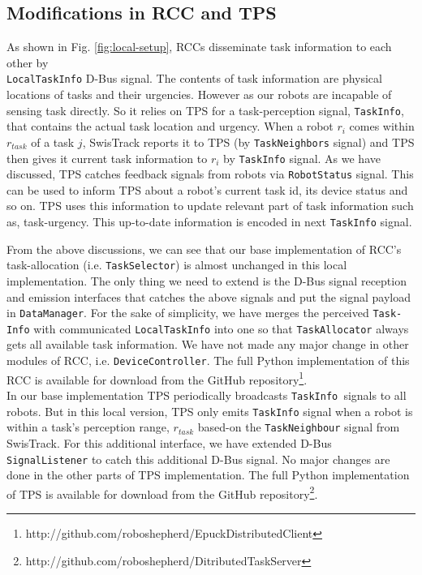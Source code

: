 \subsection*{Modifications in RCC and TPS}
As shown in Fig. \ref{fig:local-setup}, RCCs disseminate task information to each other by\\ \texttt{LocalTaskInfo} D-Bus signal. The contents of task information are physical locations of tasks and their urgencies. However as our robots are incapable of sensing task directly. So it relies on TPS for a task-perception signal, \texttt{TaskInfo}, that contains the actual task location and urgency. When a robot $r_i$ comes within $r_{task}$ of a task $j$, SwisTrack reports it to TPS (by \texttt{TaskNeighbors} signal) and TPS then gives it current task information to $r_i$ by  \texttt{TaskInfo} signal. As we have discussed, TPS catches feedback signals from robots via \texttt{RobotStatus} signal. This can be used to inform TPS about a robot's current task id, its device status and so on. TPS uses this information to update relevant part of task information such as, task-urgency. This up-to-date information is encoded in next \texttt{TaskInfo} signal.

From the above discussions, we can see that our base implementation of RCC's task-allocation (i.e. \texttt{TaskSelector}) is almost unchanged in this local implementation. The only thing we need to extend is the D-Bus signal reception and emission interfaces that catches the above signals and put the signal payload in \texttt{DataManager}. For the sake of simplicity, we have merges the perceived \texttt{Task-}\\ \texttt{Info} with communicated \texttt{LocalTaskInfo} into one so that \texttt{TaskAllocator} always gets all available task information. We have not made any major change in other modules of RCC, i.e. \texttt{DeviceController}. The full Python implementation of this RCC is available for download from the GitHub repository\footnote{http://github.com/roboshepherd/EpuckDistributedClient }.\\ 
In our base implementation TPS periodically broadcasts \texttt{TaskInfo }signals to all robots. But in this local version, TPS only emits \texttt{TaskInfo} signal when a robot is within a task's perception range, $r_{task}$ based-on the \texttt{TaskNeighbour} signal from SwisTrack. For this additional interface, we have extended D-Bus \texttt{SignalListener} to catch this additional D-Bus signal.  No major changes are done in the other parts of TPS implementation. The full Python implementation of TPS is available for download from the GitHub repository\footnote{http://github.com/roboshepherd/DitributedTaskServer}.
